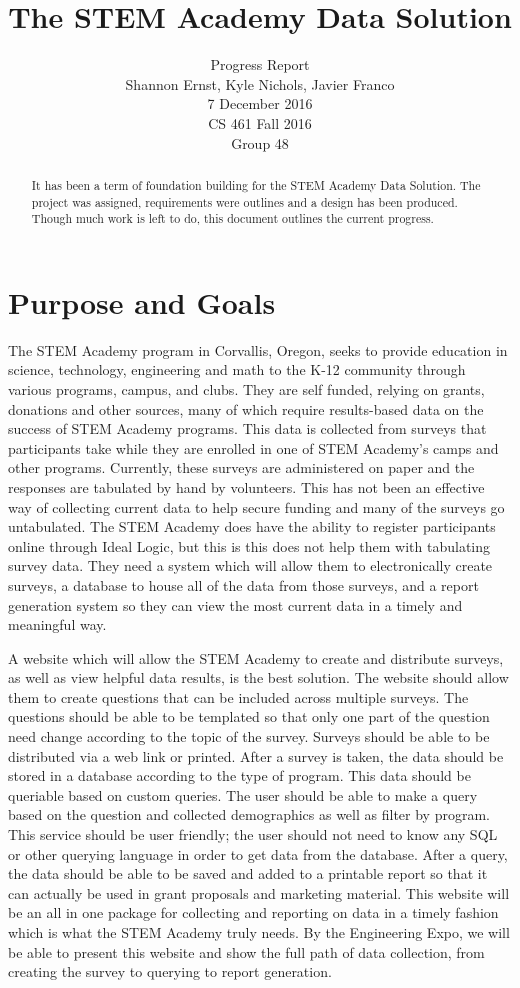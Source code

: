 \documentclass[letterpaper,10pt,serif, draftclsnofoot,onecolumn, compsoc, titlepage]{IEEEtran}
\title{The STEM Academy Data Solution}
\author{Progress Report \\ Shannon Ernst, Kyle Nichols, Javier Franco\\ 7 December 2016\\ CS 461 Fall 2016\\ Group 48}
\begin{document}
\maketitle
\begin{abstract}
It has been a term of foundation building for the STEM Academy Data Solution. The project was assigned, requirements were outlines and a design has been produced. Though much work is left to do, this document outlines the current progress.
\end{abstract}
\newpage
\section{Purpose and Goals}
The STEM Academy program in Corvallis, Oregon, seeks to provide education in science, technology, engineering and math to the K-12 community through various programs, campus, and clubs.
They are self funded, relying on grants, donations and other sources, many of which require results-based data on the success of STEM Academy programs.
This data is collected from surveys that participants take while they are enrolled in one of STEM Academy's camps and other programs.
Currently, these surveys are administered on paper and the responses are tabulated by hand by volunteers.
This has not been an effective way of collecting current data to help secure funding and many of the surveys go untabulated.
The STEM Academy does have the ability to register participants online through Ideal Logic, but this is this does not help them with tabulating survey data.
They need a system which will allow them to electronically create surveys, a database to house all of the data from those surveys, and a report generation system so they can view the most current data in a timely and meaningful way.

A website which will allow the STEM Academy to create and distribute surveys, as well as view helpful data results, is the best solution.
The website should allow them to create questions that can be included across multiple surveys.
The questions should be able to be templated so that only one part of the question need change according to the topic of the survey.
Surveys should be able to be distributed via a web link or printed.
After a survey is taken, the data should be stored in a database according to the type of program.
This data should be queriable based on custom queries.
The user should be able to make a query based on the question and collected demographics as well as filter by program.
This service should be user friendly; the user should not need to know any SQL or other querying language in order to get data from the database.
After a query, the data should be able to be saved and added to a printable report so that it can actually be used in grant proposals and marketing material.
This website will be an all in one package for collecting and reporting on data in a timely fashion which is what the STEM Academy truly needs.
By the Engineering Expo, we will be able to present this website and show the full path of data collection, from creating the survey to querying to report generation.
\end{document}

